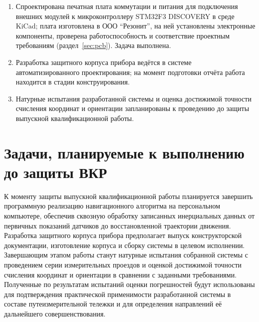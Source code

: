 \begin{enumerate}
	\item Спроектирована печатная плата коммутации и питания для подключения внешних модулей к микроконтроллеру STM32F3 DISCOVERY в среде KiCad; плата изготовлена в ООО \enquote{Резонит}, на ней установлены электронные компоненты, проверена работоспособность и соответствие проектным требованиям (раздел~\ref{sec:pcb}). Задача выполнена.
	
	\item Разработка защитного корпуса прибора ведётся в системе автоматизированного проектирования; на момент подготовки отчёта работа находится в стадии конструирования.
	
	\item Натурные испытания разработанной системы и оценка достижимой точности счисления координат и ориентации запланированы к проведению до защиты выпускной квалификационной работы.
\end{enumerate}

\section*{Задачи, планируемые к выполнению до защиты ВКР}

К моменту защиты выпускной квалификационной работы планируется завершить программную реализацию навигационного алгоритма на персональном компьютере, обеспечив сквозную обработку записанных инерциальных данных от первичных показаний датчиков до восстановленной траектории движения. Разработка защитного корпуса прибора предполагает выпуск конструкторской документации, изготовление корпуса и сборку системы в целевом исполнении. Завершающим этапом работы станут натурные испытания собранной системы с проведением серии измерительных проездов и оценкой достижимой точности счисления координат и ориентации в сравнении с заданными требованиями. Полученные по результатам испытаний оценки погрешностей будут использованы для подтверждения практической применимости разработанной системы в составе путеизмерительной тележки и для определения направлений её дальнейшего совершенствования.